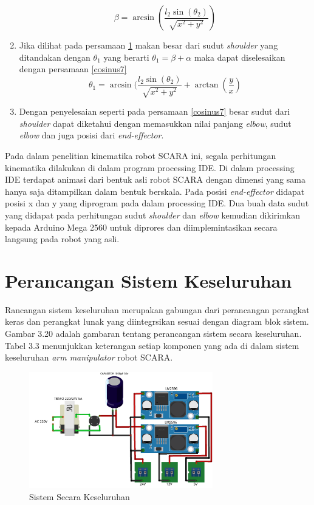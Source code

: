 \begin{enumerate}
\begin{equation}
	\beta=\arcsin(\frac{l_{2}\sin(\theta_{2})}{\sqrt{x^2+y^2}})
	\label{cosinus6}
	\end{equation}
	\item Jika dilihat pada persamaan \ref{g_ik} makan besar dari sudut \textit{shoulder} yang ditandakan dengan $\theta_{1}$ yang berarti $\theta_{1}=\beta+\alpha$ maka dapat diselesaikan dengan persamaan \ref{cosinus7}
	\begin{equation}
	\theta_{1}=\arcsin(\frac{l_{2}\sin(\theta_{2})}{\sqrt{x^2+y^2}}+\arctan(\frac{y}{x})
	\label{cosinus7}
	\end{equation}
	\item  Dengan penyelesaian seperti pada persamaan \ref{cosinus7} besar sudut dari \textit{shoulder} dapat diketahui dengan memasukkan nilai panjang \textit{elbow}, sudut \textit{elbow} dan juga posisi dari \textit{end-effector}.
\end{enumerate}

Pada dalam penelitian kinematika robot SCARA ini, segala perhitungan kinematika dilakukan di dalam program processing IDE. Di dalam processing IDE terdapat animasi dari bentuk asli robot SCARA dengan dimensi yang sama hanya saja ditampilkan dalam bentuk berskala. Pada posisi \textit{end-effector} didapat posisi x dan y yang diprogram pada dalam processing IDE. Dua buah data sudut yang didapat pada perhitungan sudut \textit{shoulder} dan \textit{elbow} kemudian dikirimkan kepada Arduino Mega 2560 untuk diprores dan diimplemintasikan secara langsung pada robot yang asli.

\section{Perancangan Sistem Keseluruhan}
Rancangan sistem keseluruhan merupakan gabungan dari perancangan perangkat keras dan perangkat lunak yang diintegrsikan sesuai dengan diagram blok sistem. Gambar 3.20 adalah gambaran tentang perancangan sistem secara keseluruhan. Tabel 3.3  menunjukkan keterangan setiap komponen yang ada di dalam sistem keseluruhan \textit{arm manipulator} robot SCARA. 
\begin{figure}[H]
	\centering
	\includegraphics[width=8cm]{gambar/catudaya_bb.png}
	\caption{Sistem Secara Keseluruhan}
	\label{g_ik}
\end{figure}

